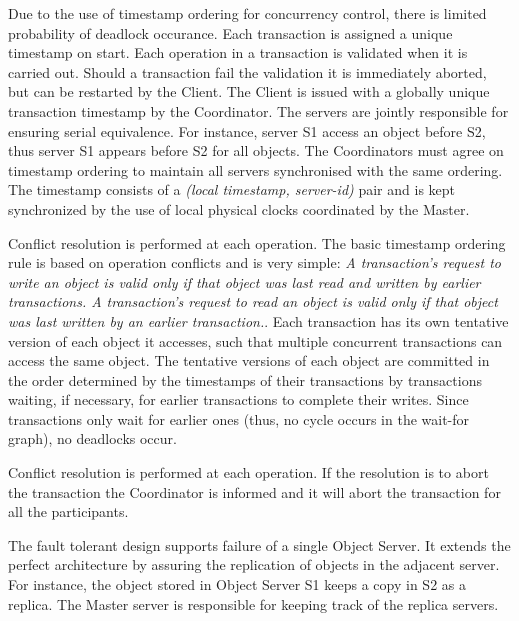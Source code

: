 \documentclass[times, 10pt,twocolumn]{article}
\begin{document}
\label{subsec:dldetect}
Due to the use of timestamp ordering for concurrency control, there is limited probability of deadlock occurance.
Each transaction is assigned a unique timestamp on start. Each operation in a transaction is validated when it is carried out.
Should a transaction fail the validation it is immediately aborted, but can be restarted by the Client. The Client is issued with a globally unique transaction timestamp by the Coordinator. The servers are jointly responsible for ensuring serial equivalence. For instance, server S1 access an object before S2, thus server S1 appears before S2 for all objects. The Coordinators must agree on timestamp ordering to maintain all servers synchronised with the same ordering. The timestamp consists of a {\it (local timestamp, server-id)} pair and is kept synchronized by the use of local physical clocks coordinated by the Master.

Conflict resolution is performed at each operation.
The basic timestamp ordering rule is based on operation conflicts and is very simple:
{\it A transaction’s request to write an object is valid only if that object was last read and written by earlier transactions. A transaction’s request to read an object is valid only if that object was
last written by an earlier transaction.}\cite{coulouris2005distributed}. Each transaction has its own tentative version of each object it accesses, such that multiple concurrent transactions can access the same object. The tentative versions of each object are committed in the order determined by the timestamps of their transactions by transactions waiting, if necessary, for earlier transactions to complete their writes.
Since transactions only wait for earlier ones (thus, no cycle occurs in the wait-for graph), no deadlocks occur.

Conflict resolution is performed at each operation. If the resolution is to abort the transaction the Coordinator is informed and it will abort the transaction for all the participants.

\label{subsec:faultol}
The fault tolerant design supports failure of a single Object Server. It extends the perfect architecture by assuring the replication of objects in the adjacent server.
For instance, the object stored in Object Server S1 keeps a copy in S2 as a replica. The Master server is responsible for keeping track of the replica servers.\\
\end{document}

